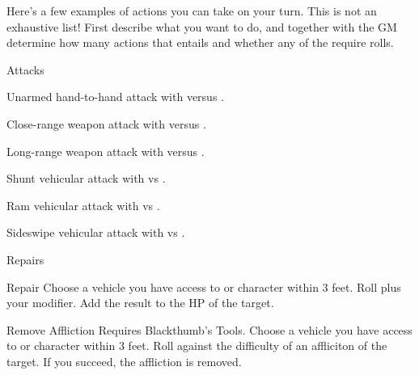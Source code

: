 
Here's a few examples of actions you can take on your turn. This is not an exhaustive list! First describe what you want to do, and together with the GM determine how many actions that entails and whether any of the require rolls.

\begin{abstractsection}{Attacks}
\vspace{1ex}

\begin{describe}{Unarmed hand-to-hand}
  attack with  versus .
\end{describe}

\begin{describe}{Close-range weapon}
  attack with  versus .
\end{describe}

\begin{describe}{Long-range weapon}
  attack with  versus .
\end{describe}

\begin{describe}{Shunt}
  vehicular attack with  vs .
\end{describe}

\begin{describe}{Ram}
  vehicular attack with  vs .
\end{describe}

\begin{describe}{Sideswipe}
  vehicular attack with  vs .
\end{describe}
\end{abstractsection}

\begin{abstractsection}{Repairs}
\vspace{1ex}

\begin{describe}{Repair}
  Choose a vehicle you have access to or character within 3 feet. Roll  plus  your  modifier. Add the result to the HP of the target.
\end{describe}

\begin{describe}{Remove Affliction}
  Requires Blackthumb's Tools. Choose a vehicle you have access to or character within 3 feet. Roll  against the difficulty of an affliciton of the target.  If you succeed, the affliction is removed.
\end{describe}
\end{abstractsection}
